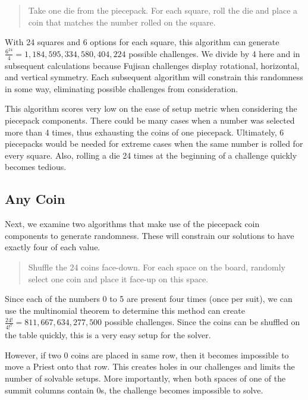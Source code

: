 \documentclass[10pt,journal,compsoc]{IEEEtran}
\begin{document}
\begin{quote}
    
  Take one die from the piecepack. For each square, roll the die and place a coin that matches the number rolled on the square.
\end{quote}

With 24 squares and 6 options for each square, this algorithm can generate $\frac{6^{24}}{4} = 1,184,595,334,580,404,224$ possible challenges. We divide by 4 here and in subsequent calculations because Fujisan challenges display rotational, horizontal, and vertical symmetry. Each subsequent algorithm will constrain this randomness in some way, eliminating possible challenges from consideration.

This algorithm scores very low on the ease of setup metric when considering the piecepack components. There could be many cases when a number was selected more than 4 times, thus exhausting the coins of one piecepack. Ultimately, 6 piecepacks would be needed for extreme cases when the same number is rolled for every square. Also, rolling a die 24 times at the beginning of a challenge quickly becomes tedious. 

\subsection{Any Coin}

Next, we examine two algorithms that make use of the piecepack coin components to generate randomness. These will constrain our solutions to have exactly four of each value.

\begin{quote}
    
  Shuffle the 24 coins face-down. For each space on the board, randomly select one coin and place it face-up on this space.
  
\end{quote}

Since each of the numbers 0 to 5 are present four times (once per suit), we can use the multinomial theorem to determine this method can create
$\frac{24!}{4!^{7}} = 811,667,634,277,500$ possible challenges. Since the coins can be shuffled on the table quickly, this is a very easy setup for the solver.

However, if two 0 coins are placed in same row, then it becomes impossible to move a Priest onto that row. This creates holes in our challenges and limits the number of solvable setups. 
More importantly, when both spaces of one of the summit columns contain 0s, the challenge becomes impossible to solve.
\end{document}
